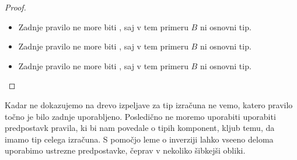 \begin{proof}
\begin{itemize}
		\item Zadnje pravilo ne more biti , saj v tem primeru $B$ ni osnovni tip.
		
		\item Zadnje pravilo ne more biti , saj v tem primeru $B$ ni osnovni tip.
		
		\item Zadnje pravilo ne more biti , saj v tem primeru $B$ ni osnovni tip.
		
	\end{itemize}
\end{proof}

Kadar ne dokazujemo na drevo izpeljave za tip izračuna ne vemo, katero pravilo točno je bilo zadnje uporabljeno. Posledično ne moremo uporabiti uporabiti predpostavk pravila, ki bi nam povedale o tipih komponent, kljub temu, da imamo tip celega izračuna.
S pomočjo leme o inverziji lahko vseeno deloma uporabimo ustrezne predpostavke, čeprav v nekoliko šibkejši obliki.

